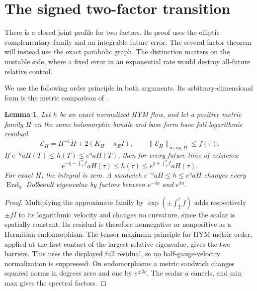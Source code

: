 \documentclass[11pt]{amsart}
\newtheorem{lemma}[theorem]{Lemma}
\theoremstyle{definition}
\theoremstyle{remark}
\newcommand{\End}{\operatorname{End}}
\begin{document}
\section{The signed two-factor transition}\label{sec05:signed}

There is a closed joint profile for two factors. Its proof uses the
elliptic complementary family and an integrable future error. The
several-factor theorem will instead use the exact parabolic graph.
The distinction matters on the unstable side, where a fixed error
in an exponential rate would destroy all-future relative control.

We use the following order principle in both arguments. Its
arbitrary-dimensional form is the metric comparison of
\cite[Propositions~4.3 and 4.5]{hkkp2018}.

\begin{lemma}\label{lem05:order}
Let \(h\) be an exact normalized HYM flow, and let a positive metric
family \(H\) on the same holomorphic bundle and base form have full
logarithmic residual
\[
 \mathcal E_H=H^{-1}\dot H+2(K_H-\kappa_EI),\qquad
 \|\mathcal E_H\|_{\infty,\mathrm{op},H}\le f(\tau).
\]
If \(e^{-\eta}aH(T)\le h(T)\le e^\eta aH(T)\), then for every
future time of existence
\begin{equation}\label{eq05:barrier}
 e^{-\eta-\int_T^\tau f}aH(\tau)
 \le h(\tau)\le
 e^{\eta+\int_T^\tau f}aH(\tau).
\end{equation}
For exact \(H\), the integral is zero. A sandwich
\(e^{-\eta}aH\le h\le e^\eta aH\) changes every \(\End_0\)
Dolbeault eigenvalue by factors between \(e^{-4\eta}\) and
\(e^{4\eta}\).
\end{lemma}

\begin{proof}
Multiplying the approximate family by
\(\exp(\pm\int_T^\tau f)\) adds respectively \(\pm fI\) to
its logarithmic velocity and changes no curvature, since the scalar
is spatially constant. Its residual is therefore nonnegative or
nonpositive as a Hermitian endomorphism. The tensor maximum
principle for HYM metric order, applied at the first contact of
the largest relative eigenvalue, gives the two barriers. This
uses the displayed full residual, so no half-gauge-velocity
normalization is suppressed. On endomorphisms a metric sandwich
changes squared norms in degrees zero and one by \(e^{\pm2\eta}\).
The scalar \(a\) cancels, and min--max gives the spectral factors.
\end{proof}
\end{document}

